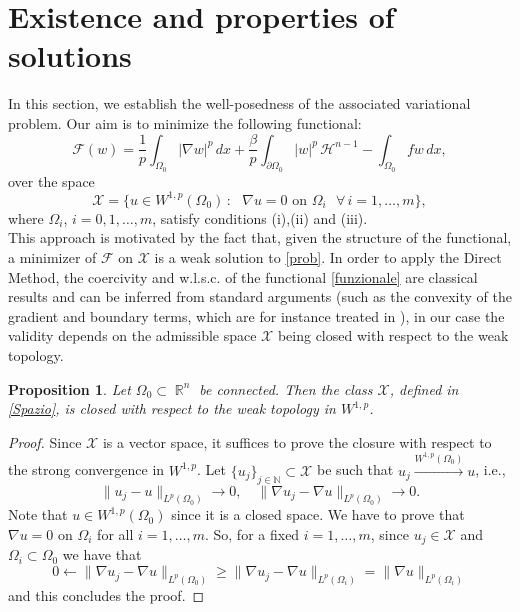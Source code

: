 \documentclass[12pt]{article}
\newcommand{\abs}[1]{{\left|#1\right|}}
\theoremstyle{definition}
\theoremstyle{plain}
\newtheorem{prop}[teorema]{Proposition}
\theoremstyle{definition}
\DeclareMathOperator{\R}{\mathbb{R}}
\begin{document}
\section{Existence and properties of solutions}\label{section3}

In this section, we establish the well-posedness of the associated variational problem. Our aim is to minimize the following functional:
\begin{equation}\label{funzionale}
    \mathcal{F}(w)=\frac{1}{p}\int_{\Omega_0}\abs{\nabla w}^p\,dx+\frac{\beta}{p}\int_{\partial\Omega_0}\abs{w}^p\,\mathcal{H}^{n-1}-\int_{\Omega_0} fw\,dx,
\end{equation}
over the space 
\begin{equation}\label{Spazio}
    \mathcal{X}=\{u\in W^{1,p}(\Omega_0)\,: \text{ $\nabla u=0$ on $\Omega_i$ $\forall\,i=1,\dots,m$}\},
\end{equation}
where $\Omega_i$, $i=0,1,\dots,m$, satisfy conditions (i),(ii) and (iii). \\
This approach is motivated by the fact that, given the structure of the functional, a minimizer of $\mathcal{F}$ on $\mathcal{X}$ is a weak solution to \eqref{prob}. In order to apply the Direct Method, the coercivity and w.l.s.c. of the functional \eqref{funzionale} are classical results and can be inferred from standard arguments (such as the convexity of the gradient and boundary terms, which are for instance treated in \cite[\S 2]{AGM}), in our case the validity depends on the admissible space $\mathcal{X}$ being closed with respect to the weak topology.
\begin{prop}\label{chiusura}
    Let $\Omega_0\subset\R^n$ be connected. Then the class $\mathcal{X}$, defined in \eqref{Spazio}, is closed with respect to the weak topology in $W^{1,p}$.
\end{prop}
\begin{proof}
    Since $\mathcal{X}$ is a vector space, it  suffices to prove the closure with respect to the strong convergence in $W^{1,p}$. Let $\{u_j\}_{j\in\mathbb{N}}\subset \mathcal{X}$ be such that $u_j\xrightarrow{W^{1,p}(\Omega_0)}u$, i.e.,
    \begin{equation*}
        \|u_j-u\|_{L^p(\Omega_0)}\rightarrow 0, \quad \|\nabla u_j-\nabla u\|_{L^p(\Omega_0)}\rightarrow 0.
    \end{equation*}
    Note that $u\in W^{1,p}(\Omega_0)$ since it is a closed space. We have to prove that $\nabla u=0$ on $\Omega_i$ for all $i=1,\dots,m$. So, for a fixed $i=1,\dots,m$, since $u_j\in \mathcal{X}$ and $\Omega_i\subset \Omega_0$ we have that
    \begin{equation*}
        0\leftarrow \|\nabla u_j-\nabla u\|_{L^p(\Omega_0)}\geq \|\nabla u_j-\nabla u\|_{L^p(\Omega_i)}=\|\nabla u\|_{L^p(\Omega_i)}
    \end{equation*}
    and this concludes the proof.
\end{proof}
\end{document}
